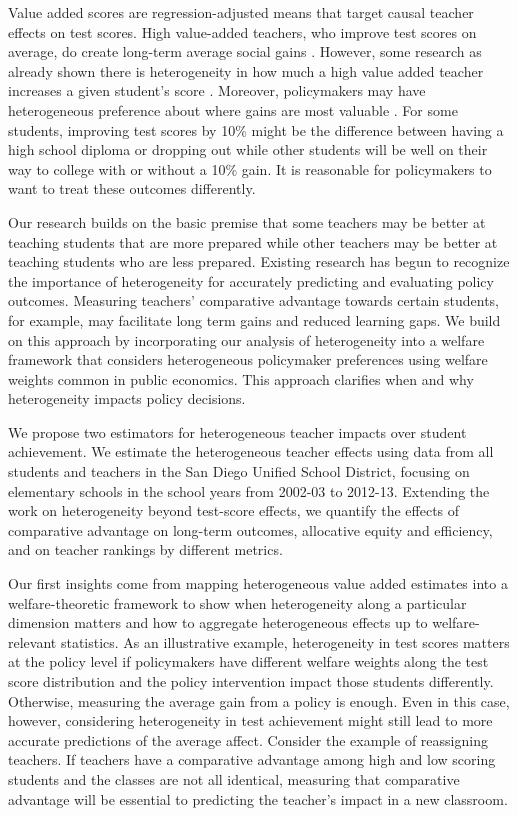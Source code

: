 \documentclass{article}
\theoremstyle{definition}
\theoremstyle{definition}
\theoremstyle{definition}
\theoremstyle{definition}
\begin{document}
    Value added scores are regression-adjusted means that target causal teacher effects on test scores.  High value-added teachers, who improve test scores on average, do create long-term average social gains \citep[e.g.,][]{chetty2014measuring2,pope2017multidimensional}. However, some research as already shown there is heterogeneity in how much a high value added teacher increases a given student's score \citep[as in][etc.]{Delgado2020,bates2022teacher}. Moreover, policymakers may have heterogeneous preference about where gains are most valuable \citep[such as No Child Left Behind, see][]{a}. For some students, improving test scores by 10\% might be the difference between having a high school diploma or dropping out while other students will be well on their way to college with or without a 10\% gain. It is reasonable for policymakers to want to treat these outcomes differently. 

    Our research builds on the basic premise that some teachers may be better at teaching students that are more prepared while other teachers may be better at teaching students who are less prepared. Existing research has begun to recognize the importance of heterogeneity for accurately predicting and evaluating policy outcomes.  Measuring teachers' comparative advantage towards certain students, for example, may facilitate long term gains and reduced learning gaps. We build on this approach by incorporating our analysis of heterogeneity into a welfare framework that considers heterogeneous policymaker preferences using welfare weights common in public economics. This approach clarifies when and why heterogeneity impacts policy decisions.
    
    We propose two estimators for heterogeneous teacher impacts over student achievement. We estimate the heterogeneous teacher effects using data from all students and teachers in the San Diego Unified School District, focusing on elementary schools in the school years from 2002-03 to 2012-13. Extending the work on heterogeneity beyond test-score effects, we quantify the effects of comparative advantage on long-term outcomes, allocative equity and efficiency, and on teacher rankings by different metrics.
    
    Our first insights come from mapping heterogeneous value added estimates into a welfare-theoretic framework to show when heterogeneity along a particular dimension matters and how to aggregate heterogeneous effects up to welfare-relevant statistics. As an illustrative example, heterogeneity in test scores matters at the policy level if policymakers have different welfare weights along the test score distribution and the policy intervention impact those students differently. Otherwise, measuring the average gain from a policy is enough. Even in this case, however, considering heterogeneity in test achievement might still lead to more accurate predictions of the average affect. Consider the example of reassigning teachers. If teachers have a comparative advantage among high and low scoring students and the classes are not all identical, measuring that comparative advantage will be essential to predicting the teacher's impact in a new classroom.
    
\end{document}
